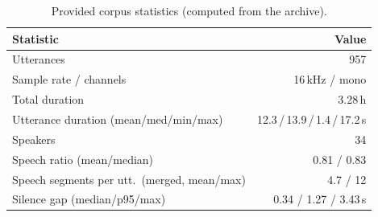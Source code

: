 \begin{table}[h]\centering\small
\begin{tabular}{@{}lr@{}}
\toprule
\textbf{Statistic} & \textbf{Value} \\ \midrule
Utterances & 957 \\
Sample rate / channels & 16\,kHz / mono \\
Total duration & 3.28\,h \\
Utterance duration (mean/med/min/max) & 12.3\,/\,13.9\,/\,1.4\,/\,17.2\,s \\
Speakers & 34 \\
Speech ratio (mean/median) & 0.81 / 0.83 \\
Speech segments per utt.\ (merged, mean/max) & 4.7 / 12 \\
Silence gap (median/p95/max) & 0.34 / 1.27 / 3.43\,s \\
\bottomrule
\end{tabular}
\caption{Provided corpus statistics (computed from the archive).}
\label{tab:provided}
\end{table}